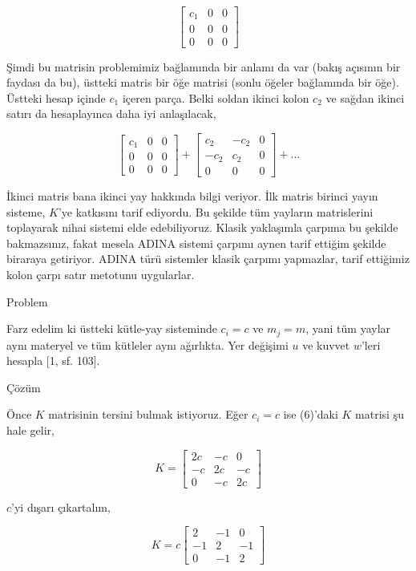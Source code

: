 \documentclass[12pt,fleqn]{article}\usepackage{../../common}
\begin{document}
$$
\left[\begin{array}{rrr}
c_1 & 0 & 0 \\ 0 & 0 & 0 \\ 0 & 0 & 0 
\end{array}\right] 
$$

Şimdi bu matrisin problemimiz bağlamında bir anlamı da var (bakış açısının bir
faydası da bu), üstteki matris bir öğe matrisi (sonlu öğeler bağlamında bir
öğe). Üstteki hesap içinde $c_1$ içeren parça. Belki soldan ikinci kolon $c_2$
ve sağdan ikinci satırı da hesaplayınca daha iyi anlaşılacak,

$$
\left[\begin{array}{rrr}
c_1 & 0 & 0 \\ 0 & 0 & 0 \\ 0 & 0 & 0 
\end{array}\right]
+
\left[\begin{array}{rrr}
c_2 & -c_2 & 0 \\ -c_2 & c_2 & 0 \\ 0 & 0 & 0 
\end{array}\right]
+ ...
$$

İkinci matris bana ikinci yay hakkında bilgi veriyor. İlk matris birinci yayın
sisteme, $K$'ye katkısını tarif ediyordu. Bu şekilde tüm yayların matrislerini
toplayarak nihai sistemi elde edebiliyoruz. Klasik yaklaşımla çarpıma bu şekilde
bakmazsınız, fakat mesela ADINA sistemi çarpımı aynen tarif ettiğim şekilde
biraraya getiriyor. ADINA türü sistemler klasik çarpımı yapmazlar, tarif
ettiğimiz kolon çarpı satır metotunu uygularlar.

Problem

Farz edelim ki üstteki kütle-yay sisteminde $c_i = c$ ve $m_j = m$, yani
tüm yaylar aynı materyel ve tüm kütleler aynı ağırlıkta. Yer değişimi $u$
ve kuvvet $w$'leri hesapla [1, sf. 103].

Çözüm

Önce $K$ matrisinin tersini bulmak istiyoruz. Eğer $c_i = c$ ise (6)'daki $K$
matrisi şu hale gelir,

$$ K = 
\left[\begin{array}{rrr}
2c   &     -c &       0 \\
-c       & 2c &     -c \\
0         & -c     &      2c
\end{array}\right]
$$

$c$'yi dışarı çıkartalım,

$$ K = c
\left[\begin{array}{rrr}
2   &     -1 &       0 \\
-1       & 2 &     -1 \\
0         & -1     &      2
\end{array}\right]
$$
\end{document}
